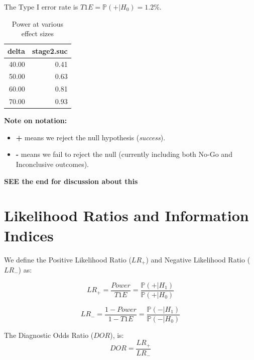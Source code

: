 \documentclass{article}\usepackage[]{graphicx}\usepackage[]{xcolor}
\newcommand{\Prob}[1]{\mathbb{P}\left(#1\right)}
\begin{document}
The Type I error rate is $\mathit{T1E} = \Prob{+|H_0} = 1.2\%$.

\begin{table}[h]
\centering
\begin{tabular}{rr}
  \hline
delta & stage2.suc \\ 
  \hline
40.00 & 0.41 \\ 
  50.00 & 0.63 \\ 
  60.00 & 0.81 \\ 
  70.00 & 0.93 \\ 
   \hline
\end{tabular}
\caption{Power at various effect sizes} 
\end{table}


\vspace{0.5cm}
\noindent \textbf{Note on notation:}
\begin{itemize}
    \item \textbf{+} means we reject the null hypothesis (\textit{success}).
    \item \textbf{-} means we fail to reject the null (currently including both No-Go and Inconclusive outcomes). 
\end{itemize}

\textbf{SEE the end for discussion about this}




\section*{Likelihood Ratios and Information Indices}

We define the Positive Likelihood Ratio ($LR_+$) and Negative Likelihood Ratio ($LR_-$) as:

\begin{equation}
    LR_+ = \frac{\mathit{Power}}{\mathit{T1E}} = \frac{\Prob{+|H_1}}{\Prob{+|H_0}}
\end{equation}

\begin{equation} 
    LR_- = \frac{1 - \mathit{Power}}{1 - \mathit{T1E}} = \frac{\Prob{-|H_1}}{\Prob{-|H_0}}
\end{equation}

The Diagnostic Odds Ratio ($DOR$), is:
\begin{equation}
    DOR = \frac{LR_+}{LR_-}
\end{equation}
\end{document}
